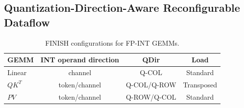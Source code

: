 \documentclass[sigconf,anonymous,nonacm]{acmart}
\newcommand{\ours}{\textsc{FINISH}}
\newcommand{\fpint}{FP-INT}
\newcommand{\wkv}{WKV}
\newcommand{\qcol}{Q-COL}
\newcommand{\qrow}{Q-ROW}
\begin{document}
\subsection{Quantization-Direction-Aware Reconfigurable Dataflow}

\begin{table}[t]
  \centering
  \caption{FINISH configurations for FP-INT GEMMs.}
  \label{tab:gemm-config}
  \renewcommand{\arraystretch}{0.95}
  \begin{tabular*}{\columnwidth}
    {@{\extracolsep{\fill}}lccc@{}}
  \toprule
  GEMM & INT operand direction & QDir & Load \\
  \midrule
  Linear & channel        & Q-COL & Standard \\
  $QK^T$ & token/channel  & Q-COL/Q-ROW & Transposed \\
  $PV$   & token/channel  & Q-ROW/Q-COL & Standard \\
  \bottomrule
  \end{tabular*}
\end{table}
\end{document}
